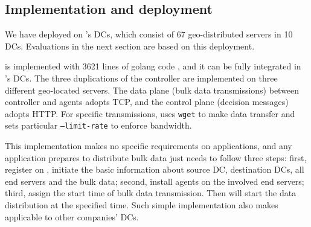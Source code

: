 \subsection{Implementation and deployment}
\label{sec:deployment}


We have deployed \name on \company's DCs, which consist of 67 geo-distributed servers in 10 DCs. Evaluations in the next section are based on this deployment. %

\name is implemented with 3621 lines of golang code \cite{golang}, and it can be fully integrated in \company's DCs. The three duplications of the controller are implemented on three different geo-located servers. 
The data plane (bulk data transmissions) between controller and agents adopts TCP, and the control plane (decision messages) adopts HTTP. For specific transmissions, \name uses \texttt{wget} to make data transfer and sets particular \texttt{--limit-rate} to enforce bandwidth.



This implementation makes no specific requirements on applications, and any application prepares to distribute bulk data just needs to follow three steps: first, register on \name, initiate the basic information about source DC, destination DCs, all end servers and the bulk data; second, install agents on the involved end servers; third, assign the start time of bulk data transmission. Then \name will start the data distribution at the specified time. Such simple implementation also makes \name applicable to other companies' DCs. 	






